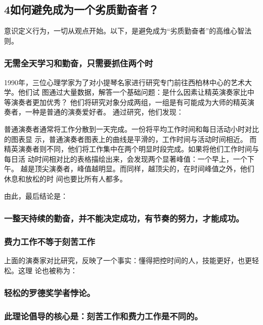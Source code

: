 \documentclass[11pt]{ctexart}
\begin{document}
{{{{\subsection{4如何避免成为一个劣质勤奋者？}
\label{sec:orgca304b5}

意识定义行为，一切从观点开始。以下，是避免成为“劣质勤奋者”的高维心智法则。

\subsubsection{无需全天学习和勤奋，只需要抓住两个时}
\label{sec:org5d0f52c}

1990年，三位心理学家为了对小提琴名家进行研究专门前往西柏林中心的艺术大学。他们试
图通过大量数据，解答一个基础问题：是什么因素让精英演奏家比中等演奏者更加优秀？
他们将研究对象分成两组，一组是有可能成为大师的精英演奏者，一种是普通的演奏爱好者。
通过研究，他们发现：

普通演奏者通常将工作分散到一天完成。一份将平均工作时间和每日活动小时对比的图表显
示，普通演奏者图表上的曲线是平滑的，工作时间与活动时间相近。
而精英演奏者则不同，他们将工作集中在两个明显时段完成。如果将他们工作时间与每日活
动时间相对比的表格描绘出来，会发现两个显著峰值：一个早上，一个下午。
越是顶尖演奏者，峰值越明显。而同样，越顶尖的，在时间峰值之外，他们休息和放松的时
间也要比所有人都多。

由此，最后结论是：

\subsubsection{一整天持续的勤奋，并不能决定成功，有节奏的努力，才能成功。}
\label{sec:org59717b2}

\subsubsection{费力工作不等于刻苦工作}
\label{sec:orgeda1fb5}

上面的演奏家对比研究，反映了一个事实：懂得把控时间的人，技能更好，也更轻松。这理
论也被称为：

\subsubsection{轻松的罗德奖学者悖论。}
\label{sec:org890cf20}

\subsubsection{此理论倡导的核心是：刻苦工作和费力工作是不同的。}
\label{sec:orga33e987}

}}}}
\end{document}
